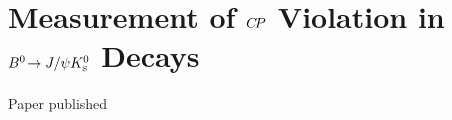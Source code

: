 
\chapter[Measurement of \texorpdfstring{$\CP$}{CP} Violation in \texorpdfstring{$\BdToJPsiKS$}{Bd2JPsiKS} Decays (10 pages)]{Measurement of \texorpdfstring{$\CP$}{CP} Violation in \texorpdfstring{$\BdToJPsiKS$}{Bd2JPsiKS} Decays}
\label{sec:bd2jpsiks}

Paper published~\cite{LHCb-Paper-2015-004}









